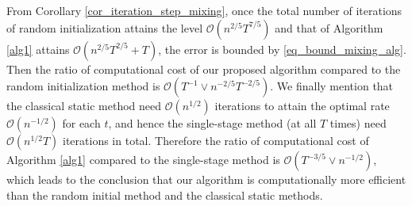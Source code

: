 \documentclass[12pt]{article}
\begin{document}
From Corollary \ref{cor_iteration_step_mixing}, once the total number of iterations of random initialization attains the level $\mathcal{O}(n^{2/5}T^{7/5})$ and that of Algorithm \ref{alg1} attains $\mathcal{O}(n^{2/5}T^{2/5}+T)$, the error is bounded by \eqref{eq_bound_mixing_alg}. %
Then the ratio of computational cost of our proposed algorithm compared to the random initialization method is $\mathcal{O}(T^{-1}\vee n^{-2/5}T^{-2/5})$.
We finally mention that the classical static method need $\mathcal{O}(n^{1/2})$ iterations to attain the optimal  rate $\mathcal{O}(n^{-1/2})$ for each $t$, and hence the single-stage method (at all $T$ times) need $\mathcal{O}(n^{1/2}T)$ iterations in total. %
Therefore the ratio of computational cost of Algorithm \ref{alg1} compared to the single-stage method is $\mathcal{O}(T^{-3/5}\vee n^{-1/2})$, which leads to the conclusion that our algorithm is computationally more efficient than the random initial method and the classical static methods. %
\end{document}
